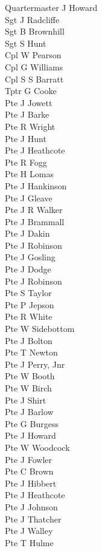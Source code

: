 \begin{multicols}{3}
  \small
  \noindent
  Quartermaster J Howard \\
  Sgt J Radcliffe \\
  Sgt B Brownhill \\
  Sgt S Hunt \\
  Cpl W Pearson \\
  Cpl G Williams \\
  Cpl S S Barratt \\
  Tptr G Cooke \\
  Pte J Jowett \\
  Pte J Barke \\
  Pte R Wright \\
  Pte J Hunt \\
  Pte J Heathcote \\
  Pte R Fogg \\
  Pte H Lomas \\
  Pte J Hankinson \\
  Pte J Gleave \\
  Pte J R Walker \\
  Pte J Brammall \\
  Pte J Dakin \\
  Pte J Robinson \\
  Pte J Gosling \\
  Pte J Dodge \\
  Pte J Robinson \\
  Pte S Taylor \\
  Pte P Jepson \\
  Pte R White \\
  Pte W Sidebottom \\
  Pte J Bolton \\
  Pte T Newton \\
  Pte J Perry, Jnr \\
  Pte W Booth \\
  Pte W Birch \\
  Pte J Shirt \\
  Pte J Barlow \\
  Pte G Burgess \\
  Pte J Howard \\
  Pte W Woodcock \\
  Pte J Fowler \\
  Pte C Brown \\
  Pte J Hibbert \\
  Pte J Heathcote \\
  Pte J Johnson \\
  Pte J Thatcher \\
  Pte J Walley \\
  Pte T Hulme \\
\end{multicols}
